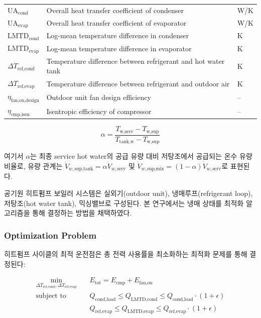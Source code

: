 \documentclass[final,5p,times,twocolumn,authoryear]{elsarticle}
\begin{document}
\begin{table}[t]
\begin{tabularx}{\columnwidth}{l X l}
$\text{UA}_{\text{cond}}$ & Overall heat transfer coefficient of condenser & W/K \\
$\text{UA}_{\text{evap}}$ & Overall heat transfer coefficient of evaporator & W/K \\
$\text{LMTD}_{\text{cond}}$ & Log-mean temperature difference in condenser & K \\
$\text{LMTD}_{\text{evap}}$ & Log-mean temperature difference in evaporator & K \\
$\Delta T_{\text{ref,cond}}$ & Temperature difference between refrigerant and hot water tank & K \\
$\Delta T_{\text{ref,evap}}$ & Temperature difference between refrigerant and outdoor air & K \\
$\eta_{\text{fan,ou,design}}$ & Outdoor unit fan design efficiency & -- \\
$\eta_{\text{cmp,isen}}$ & Isentropic efficiency of compressor & -- \\
\bottomrule
\end{tabularx}
\end{table}

\begin{equation}
\label{eq:hpb_mixing_ratio}
\alpha = \frac{T_{\text{w,serv}} - T_{\text{w,sup}}}{T_{\text{tank,w}} - T_{\text{w,sup}}}
\end{equation}

여기서 $\alpha$는 최종 service hot water의 공급 유량 대비 저탕조에서 공급되는 온수 유량 비율로, 유량 관계는 $\dot{V}_{w,\text{sup,tank}} = \alpha \dot{V}_{w,\text{serv}}$ 및 $\dot{V}_{w,\text{sup,mix}} = (1 - \alpha) \dot{V}_{w,\text{serv}}$로 표현된다.

공기원 히트펌프 보일러 시스템은 실외기(outdoor unit), 냉매루프(refrigerant loop), 저탕조(hot water tank), 믹싱밸브로 구성된다. 본 연구에서는 냉매 상태를 최적화 알고리즘을 통해 결정하는 방법을 채택하였다.

\subsubsection{Optimization Problem}

히트펌프 사이클의 최적 운전점은 총 전력 사용률을 최소화하는 최적화 문제를 통해 결정된다:

\begin{equation}
\label{eq:hpb_optimization}
\begin{aligned}
\min_{\Delta T_{\text{ref,cond}}, \Delta T_{\text{ref,evap}}} \quad & E_{\text{tot}} = E_{\text{cmp}} + E_{\text{fan,ou}} \\
\text{subject to} \quad & Q_{\text{cond,load}} \leq Q_{\text{LMTD,cond}} \leq Q_{\text{cond,load}} \cdot (1 + \epsilon) \\
& Q_{\text{ref,evap}} \leq Q_{\text{LMTD,evap}} \leq Q_{\text{ref,evap}} \cdot (1 + \epsilon)
\end{aligned}
\end{equation}
\end{document}
